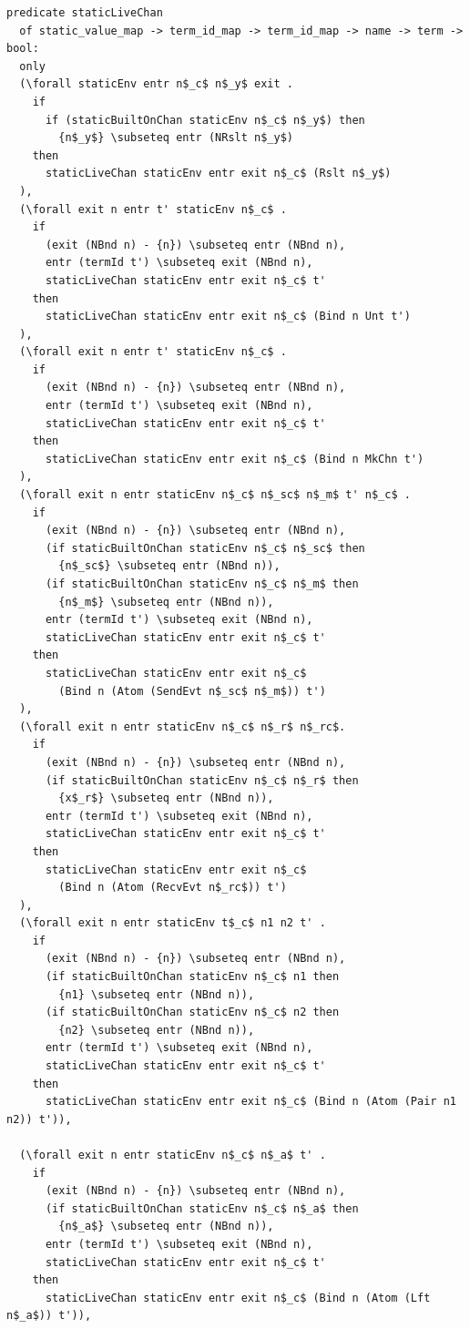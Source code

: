 \documentclass[10pt]{article}
\begin{document}
\begin{lstlisting}[language=logic, mathescape]
  predicate staticLiveChan
  of static_value_map -> term_id_map -> term_id_map -> name -> term -> bool:
  only
  (\forall staticEnv entr n$_c$ n$_y$ exit .
    if
      if (staticBuiltOnChan staticEnv n$_c$ n$_y$) then
        {n$_y$} \subseteq entr (NRslt n$_y$)
    then
      staticLiveChan staticEnv entr exit n$_c$ (Rslt n$_y$)
  ),
  (\forall exit n entr t' staticEnv n$_c$ .
    if 
      (exit (NBnd n) - {n}) \subseteq entr (NBnd n),
      entr (termId t') \subseteq exit (NBnd n),
      staticLiveChan staticEnv entr exit n$_c$ t'
    then 
      staticLiveChan staticEnv entr exit n$_c$ (Bind n Unt t')
  ),
  (\forall exit n entr t' staticEnv n$_c$ .
    if
      (exit (NBnd n) - {n}) \subseteq entr (NBnd n),
      entr (termId t') \subseteq exit (NBnd n),
      staticLiveChan staticEnv entr exit n$_c$ t'
    then 
      staticLiveChan staticEnv entr exit n$_c$ (Bind n MkChn t')
  ),
  (\forall exit n entr staticEnv n$_c$ n$_sc$ n$_m$ t' n$_c$ .
    if
      (exit (NBnd n) - {n}) \subseteq entr (NBnd n),
      (if staticBuiltOnChan staticEnv n$_c$ n$_sc$ then
        {n$_sc$} \subseteq entr (NBnd n)),
      (if staticBuiltOnChan staticEnv n$_c$ n$_m$ then 
        {n$_m$} \subseteq entr (NBnd n)),
      entr (termId t') \subseteq exit (NBnd n),
      staticLiveChan staticEnv entr exit n$_c$ t'
    then
      staticLiveChan staticEnv entr exit n$_c$
        (Bind n (Atom (SendEvt n$_sc$ n$_m$)) t')
  ),
  (\forall exit n entr staticEnv n$_c$ n$_r$ n$_rc$.    
    if
      (exit (NBnd n) - {n}) \subseteq entr (NBnd n),
      (if staticBuiltOnChan staticEnv n$_c$ n$_r$ then
        {x$_r$} \subseteq entr (NBnd n)),
      entr (termId t') \subseteq exit (NBnd n),
      staticLiveChan staticEnv entr exit n$_c$ t'
    then
      staticLiveChan staticEnv entr exit n$_c$
        (Bind n (Atom (RecvEvt n$_rc$)) t')
  ),
  (\forall exit n entr staticEnv t$_c$ n1 n2 t' .
    if
      (exit (NBnd n) - {n}) \subseteq entr (NBnd n),
      (if staticBuiltOnChan staticEnv n$_c$ n1 then
        {n1} \subseteq entr (NBnd n)),
      (if staticBuiltOnChan staticEnv n$_c$ n2 then
        {n2} \subseteq entr (NBnd n)),
      entr (termId t') \subseteq exit (NBnd n),
      staticLiveChan staticEnv entr exit n$_c$ t'
    then
      staticLiveChan staticEnv entr exit n$_c$ (Bind n (Atom (Pair n1 n2)) t')),

  (\forall exit n entr staticEnv n$_c$ n$_a$ t' . 
    if
      (exit (NBnd n) - {n}) \subseteq entr (NBnd n),
      (if staticBuiltOnChan staticEnv n$_c$ n$_a$ then
        {n$_a$} \subseteq entr (NBnd n)),
      entr (termId t') \subseteq exit (NBnd n),
      staticLiveChan staticEnv entr exit n$_c$ t'
    then
      staticLiveChan staticEnv entr exit n$_c$ (Bind n (Atom (Lft n$_a$)) t')),


\end{lstlisting}
\end{document}
